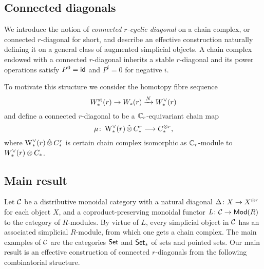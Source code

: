 \subsection{Connected diagonals}

We introduce the notion of \emph{connected $r$-cyclic diagonal} on a chain complex, or connected $r$-diagonal for short, and describe an effective construction naturally defining it on a general class of augmented simplicial objects.
A chain complex endowed with a connected $r$-diagonal inherits a stable $r$-diagonal and its power operations satisfy $P^0 = \mathsf{id}$ and $P^i = 0$ for negative $i$.

To motivate this structure we consider the homotopy fibre sequence
\[
W^{\mathrm{st}}_{*}(r) \to W_{*}(r) \xrightarrow{N} W^\vee_{*}(r)
\]
and define a connected $r$-diagonal to be a $\mathbb{C}_r$-equivariant chain map
\[
\mu \colon \operatorname{W}^\vee_{*}(r) \operatorname{\hat{\otimes}} C^{r}_{*} \longrightarrow C_{*}^{\otimes r},
\]
where $\operatorname{W}^\vee_{*}(r) \operatorname{\hat{\otimes}} C^{r}_{*}$ is certain chain complex isomorphic as $\mathbb{C}_r$-module to $W^\vee_{*}(r) \otimes C_{*}$.


\subsection{Main result}

Let $\mathcal{C}$ be a distributive monoidal category with a natural diagonal $\Delta \colon X \to X^{\otimes r}$ for each object $X$, and a coproduct-preserving monoidal functor $\operatorname{{\it L}} \colon \mathcal{C} \to \mathsf{Mod}(R)$ to the category of $R$-modules.
By virtue of $L$, every simplicial object in $\mathcal{C}$ has an associated simplicial $R$-module, from which one gets a chain complex.
The main examples of $\mathcal{C}$ are the categories $\mathsf{Set}$ and $\mathsf{Set}_*$ of sets and pointed sets.
Our main result is an effective construction of connected $r$-diagonals from the following combinatorial structure.

